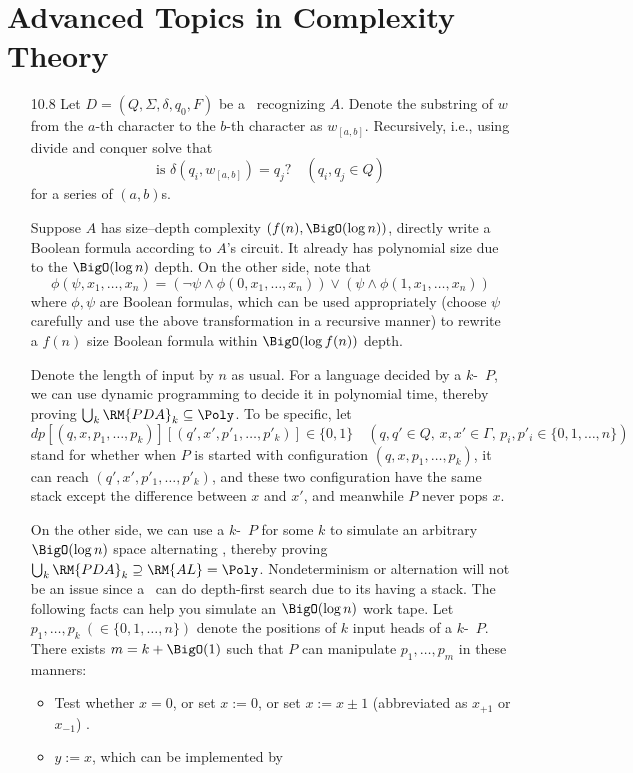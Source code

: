 \section{Advanced Topics in Complexity Theory}

\begin{itemize}
	
	\item[10.8]
	Let $D = (Q, \Sigma, \delta, q_0, F)$ be a \DFA\ recognizing $A$. Denote the substring of $w$ from the $a$-th character to the $b$-th character as $w_{[a,b]}$. Recursively, i.e., using divide and conquer solve that
	$$
		\text{is $\delta(q_i, w_{[a,b]}) = q_j\text{?} \quad (q_i, q_j \in Q)$}
	$$
	for a series of $(a, b)$s.
	
	\item[\Star 10.9]
	Suppose $A$ has size--depth complexity $(f(n), \BigO(\log n))$, directly write a Boolean formula according to $A$'s circuit. It already has polynomial size due to the $\BigO(\log n)$ depth. On the other side, note that
	$$
		\phi(\psi, x_1, \dots, x_n) = (\neg \psi \wedge \phi(0, x_1, \dots, x_n)) \vee (\psi \wedge \phi(1, x_1, \dots, x_n))
	$$
	where $\phi, \psi$ are Boolean formulas, which can be used appropriately (choose $\psi$ carefully and use the above transformation in a recursive manner) to rewrite a $f(n)$ size Boolean formula within $\BigO(\log f(n))$ depth.
	
	\item[\Star 10.10]
	Denote the length of input by $n$ as usual. For a language decided by a $k$-\PDA\ $P$, we can use dynamic programming to decide it in polynomial time, thereby proving $\bigcup_k \RM{PDA}_k \subseteq \Poly$. To be specific, let
	$$
		dp[(q, x, p_1, \dots, p_k)][(q', x', p'_1, \dots, p'_k)] \in \{0, 1\} \quad (q, q' \in Q,\, x, x' \in \Gamma,\, p_i, p'_i \in \{0, 1, \dots, n\})
	$$
	stand for whether when $P$ is started with configuration $(q, x, p_1, \dots, p_k)$, it can reach $(q', x', p'_1, \dots, p'_k)$, and these two configuration have the same stack except the difference between $x$ and $x'$, and meanwhile $P$ never pops $x$.
	
	On the other side, we can use a $k$-\PDA\ $P$ for some $k$ to simulate an arbitrary $\BigO(\log n)$ space alternating \TM , thereby proving $\bigcup_k \RM{PDA}_k \supseteq \RM{AL} = \Poly$. Nondeterminism or alternation will not be an issue since a \PDA\ can do depth-first search due to its having a stack. The following facts can help you simulate an $\BigO(\log n)$ work tape. Let $p_1, \dots, p_k\ (\in \{0, 1, \dots, n\})$ denote the positions of $k$ input heads of a $k$-\PDA\ $P$. There exists $m = k + \BigO(1)$ such that $P$ can manipulate $p_1, \dots, p_m$ in these manners: 
	\begin{itemize}
		\item Test whether $x = 0$, or set $x := 0$, or set $x := x \pm 1$ (abbreviated as $x_{+1}$ or $x_{-1}$) .
		\item $y := x$, which can be implemented by
		

\end{itemize}
\end{itemize}
